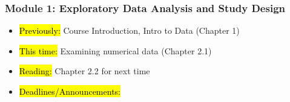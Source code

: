 
\begin{frame}
    \frametitle{Module 1: Exploratory Data Analysis and Study Design}
    \begin{itemize}
        \item \hl{Previously: } Course Introduction, Intro to Data (Chapter 1)
        \item \hl{This time: } Examining numerical data (Chapter 2.1)
        \item \hl{Reading: } Chapter 2.2 for next time
        \item \hl{Deadlines/Announcements: } 
    \end{itemize}
    
    \end{frame}
    